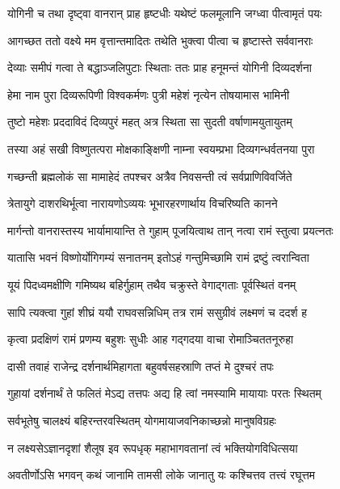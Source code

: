 \twolineshloka
{योगिनी च तथा दृष्ट्वा वानरान् प्राह हृष्टधीः}
{यथेष्टं फलमूलानि जग्ध्वा पीत्वामृतं पयः} %

\twolineshloka
{आगच्छत ततो वक्ष्ये मम वृत्तान्तमादितः}
{तथेति भुक्त्वा पीत्वा च हृष्टास्ते सर्ववानराः} %

\twolineshloka
{देव्याः समीपं गत्वा ते बद्धाञ्जलिपुटाः स्थिताः}
{ततः प्राह हनूमन्तं योगिनी दिव्यदर्शना} %

\twolineshloka
{हेमा नाम पुरा दिव्यरूपिणी विश्वकर्मणः}
{पुत्री महेशं नृत्येन तोषयामास भामिनी} %

\twolineshloka
{तुष्टो महेशः प्रददाविदं दिव्यपुरं महत्}
{अत्र स्थिता सा सुदती वर्षाणामयुतायुतम्} %

\twolineshloka
{तस्या अहं सखी विष्णुतत्परा मोक्षकाङ्क्षिणी}
{नाम्ना स्वयम्प्रभा दिव्यगन्धर्वतनया पुरा} %

\twolineshloka
{गच्छन्ती ब्रह्मलोकं सा मामाहेदं तपश्चर}
{अत्रैव निवसन्ती त्वं सर्वप्राणिविवर्जिते} %

\twolineshloka
{त्रेतायुगे दाशरथिर्भूत्वा नारायणोऽव्ययः}
{भूभारहरणार्थाय विचरिष्यति कानने} %

\twolineshloka
{मार्गन्तो वानरास्तस्य भार्यामायान्ति ते गुहाम्}
{पूजयित्वाथ तान् नत्वा रामं स्तुत्वा प्रयत्नतः} %

\twolineshloka
{यातासि भवनं विष्णोर्योगिगम्यं सनातनम्}
{इतोऽहं गन्तुमिच्छामि रामं द्रष्टुं त्वरान्विता} %

\twolineshloka
{यूयं पिदध्वमक्षीणि गमिष्यथ बहिर्गुहाम्}
{तथैव चक्रुस्ते वेगाद्गताः पूर्वस्थितं वनम्} %

\twolineshloka
{सापि त्यक्त्वा गुहां शीघ्रं ययौ राघवसन्निधिम्}
{तत्र रामं ससुग्रीवं लक्ष्मणं च ददर्श ह} %

\twolineshloka
{कृत्वा प्रदक्षिणं रामं प्रणम्य बहुशः सुधीः}
{आह गद्गदया वाचा रोमाञ्चिततनूरुहा} %

\twolineshloka
{दासी तवाहं राजेन्द्र दर्शनार्थमिहागता}
{बहुवर्षसहस्राणि तप्तं मे दुश्चरं तपः} %

\twolineshloka
{गुहायां दर्शनार्थं ते फलितं मेऽद्य तत्तपः}
{अद्य हि त्वां नमस्यामि मायायाः परतः स्थितम्} %

\twolineshloka
{सर्वभूतेषु चालक्ष्यं बहिरन्तरवस्थितम्}
{योगमायाजवनिकाच्छन्नो मानुषविग्रहः} %

\twolineshloka
{न लक्ष्यसेऽज्ञानदृशां शैलूष इव रूपधृक्}
{महाभागवतानां त्वं भक्तियोगविधित्सया} %

\twolineshloka
{अवतीर्णोऽसि भगवन् कथं जानामि तामसी}
{लोके जानातु यः कश्चित्तव तत्त्वं रघूत्तम} %

